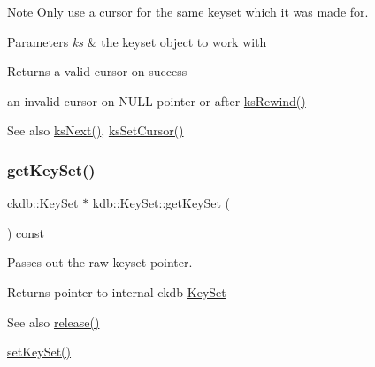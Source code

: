 \begin{DoxyNote}{Note}
Only use a cursor for the same keyset which it was made for.
\end{DoxyNote}

\begin{DoxyParams}{Parameters}
{\em ks} & the keyset object to work with \\
\hline
\end{DoxyParams}
\begin{DoxyReturn}{Returns}
a valid cursor on success 

an invalid cursor on N\+U\+LL pointer or after \hyperlink{group__keyset_gabe793ff51f1728e3429c84a8a9086b70}{ks\+Rewind()} 
\end{DoxyReturn}
\begin{DoxySeeAlso}{See also}
\hyperlink{group__keyset_ga317321c9065b5a4b3e33fe1c399bcec9}{ks\+Next()}, \hyperlink{group__keyset_gad94c9ffaa3e8034564c0712fd407c345}{ks\+Set\+Cursor()} 
\end{DoxySeeAlso}
\mbox{\label{classkdb_1_1KeySet_a4e9a3906e0b18a783f8a6e8bdbec9ed0}} 
\subsubsection{\texorpdfstring{get\+Key\+Set()}{getKeySet()}}
{\footnotesize\ttfamily ckdb\+::\+Key\+Set $\ast$ kdb\+::\+Key\+Set\+::get\+Key\+Set (\begin{DoxyParamCaption}{ }\end{DoxyParamCaption}) const\hspace{0.3cm}{\ttfamily [inline]}}



Passes out the raw keyset pointer. 

\begin{DoxyReturn}{Returns}
pointer to internal ckdb \hyperlink{classkdb_1_1KeySet}{Key\+Set}
\end{DoxyReturn}
\begin{DoxySeeAlso}{See also}
\hyperlink{classkdb_1_1KeySet_a2987b3fb1b12196399650726f1c18f02}{release()} 

\hyperlink{classkdb_1_1KeySet_a9f3ec4eebe304185527b08a6fa01b77c}{set\+Key\+Set()} 
\end{DoxySeeAlso}
\mbox{\label{classkdb_1_1KeySet_a1aca3689ed08cbc909976cdf874cfb59}} 
